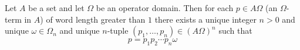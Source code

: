 Let $A$ be a set and let $\Omega$ be an operator domain. Then for each $p \in A\Omega$ (an $\Omega$-term in $A$) of word length greater than $1$ there exists a unique integer $n > 0$ and unique $\omega \in \Omega_n$ and unique $n$-tuple $(p_1, \ldots, p_n) \in (A\Omega)^n$ such that
$$p = p_1 p_2 \cdots p_n \omega$$
